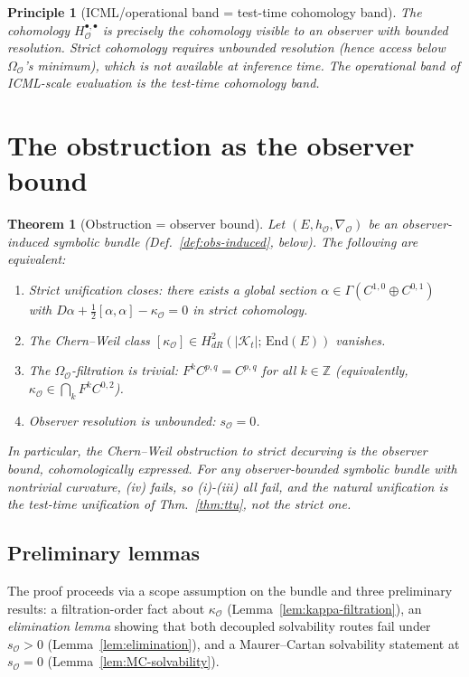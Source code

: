 \documentclass[11pt]{article}
\newtheorem{theorem}{Theorem}
\newtheorem*{principle}{Principle}
\newcommand{\Obs}{\mathcal{O}}
\newcommand{\OmegaO}{\Omega_{\Obs}}
\newcommand{\kappaO}{\kappa_{\Obs}}
\newcommand{\nablaO}{\nabla_{\Obs}}
\newcommand{\hO}{h_{\Obs}}
\newcommand{\rmin}{s_{\Obs}}
\newcommand{\EE}{E}
\newcommand{\Kt}{\mathcal{K}_t}
\newcommand{\End}{\mathrm{End}}
\newcommand{\HO}{H_\Obs}
\begin{document}
\begin{principle}[ICML/operational band = test-time cohomology band]
\label{princ:icml}
The cohomology $\HO^{\bullet, \bullet}$ is precisely the cohomology
visible to an observer with bounded resolution. Strict cohomology
requires unbounded resolution (hence access below $\OmegaO$'s
minimum), which is not available at inference time. The
operational band of ICML-scale evaluation \emph{is} the test-time
cohomology band.
\end{principle}

\section{The obstruction as the observer bound}
\label{sec:obstruction}

\begin{theorem}[Obstruction = observer bound]
\label{thm:obs-is-bd}
Let $(\EE, \hO, \nablaO)$ be an observer-induced symbolic bundle
(Def.~\ref{def:obs-induced}, below). The following are equivalent:
\begin{enumerate}[label=(\roman*),leftmargin=*,itemsep=2pt]
\item Strict unification closes: there exists a global section
$\alpha \in \Gamma(C^{1, 0} \oplus C^{0, 1})$ with
$D\alpha + \tfrac{1}{2}[\alpha, \alpha] - \kappaO = 0$ in strict
cohomology.
\item The Chern--Weil class $[\kappaO] \in H^2_{dR}(|\Kt|;\,
\End(\EE))$ vanishes.
\item The $\OmegaO$-filtration is trivial: $F^k C^{p, q} = C^{p, q}$
for all $k \in \mathbb{Z}$ (equivalently, $\kappaO \in \bigcap_k F^k C^{0,2}$).
\item Observer resolution is unbounded: $\rmin = 0$.
\end{enumerate}
In particular, the Chern--Weil obstruction to strict decurving
\emph{is} the observer bound, cohomologically expressed. For any
observer-bounded symbolic bundle with nontrivial curvature, (iv)
fails, so (i)-(iii) all fail, and the natural unification is the
test-time unification of Thm.~\ref{thm:ttu}, not the strict one.
\end{theorem}

\subsection*{Preliminary lemmas}

The proof proceeds via a scope assumption on the bundle and
three preliminary results: a filtration-order fact about $\kappaO$
(Lemma~\ref{lem:kappa-filtration}), an \emph{elimination lemma}
showing that both decoupled solvability routes fail under
$\rmin > 0$ (Lemma~\ref{lem:elimination}), and a Maurer--Cartan
solvability statement at $\rmin = 0$
(Lemma~\ref{lem:MC-solvability}).
\end{document}
